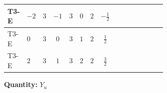 \documentclass[8pt]{article}
\begin{document}
\begin{landscape}
\begin{longtable}{@{}llcccccc >{\raggedright\arraybackslash}p{0.21\linewidth} >{\raggedright\arraybackslash}p{0.21\linewidth} >{\raggedright\arraybackslash}p{0.21\linewidth}@{}}
\midrule
T3-E & $-2$ & $3$ & $-1$ & $3$ & $0$ & $2$ & $-\frac{1}{2}$ & \scriptsize\adjustbox{max width=\linewidth}{$\begin{gathered} 3 \operatorname{Tr}\!\left({Y_d}\,\left({Y_d}\right)^{\dagger}\right) \left({Y_u}\right)_{ij}\end{gathered}$} & \scriptsize\adjustbox{max width=\linewidth}{$\begin{gathered} +\operatorname{Tr}\!\left({Y_e}\,\left({Y_e}\right)^{\dagger}\right) \left({Y_u}\right)_{ij}\end{gathered}$} & \scriptsize\adjustbox{max width=\linewidth}{$\begin{gathered} +3 \operatorname{Tr}\!\left({Y_u}\,\left({Y_u}\right)^{\dagger}\right) \left({Y_u}\right)_{ij}\end{gathered}$} \\
\midrule
T3-E & $0$ & $3$ & $0$ & $3$ & $1$ & $2$ & $\frac{1}{2}$ & \scriptsize\adjustbox{max width=\linewidth}{$\begin{gathered} 3 \operatorname{Tr}\!\left({Y_d}\,\left({Y_d}\right)^{\dagger}\right) \left({Y_u}\right)_{ij}\end{gathered}$} & \scriptsize\adjustbox{max width=\linewidth}{$\begin{gathered} +\operatorname{Tr}\!\left({Y_e}\,\left({Y_e}\right)^{\dagger}\right) \left({Y_u}\right)_{ij}\end{gathered}$} & \scriptsize\adjustbox{max width=\linewidth}{$\begin{gathered} +3 \operatorname{Tr}\!\left({Y_u}\,\left({Y_u}\right)^{\dagger}\right) \left({Y_u}\right)_{ij}\end{gathered}$} \\
\midrule
T3-E & $2$ & $3$ & $1$ & $3$ & $2$ & $2$ & $\frac{3}{2}$ & \scriptsize\adjustbox{max width=\linewidth}{$\begin{gathered} 3 \operatorname{Tr}\!\left({Y_d}\,\left({Y_d}\right)^{\dagger}\right) \left({Y_u}\right)_{ij}\end{gathered}$} & \scriptsize\adjustbox{max width=\linewidth}{$\begin{gathered} +\operatorname{Tr}\!\left({Y_e}\,\left({Y_e}\right)^{\dagger}\right) \left({Y_u}\right)_{ij}\end{gathered}$} & \scriptsize\adjustbox{max width=\linewidth}{$\begin{gathered} +3 \operatorname{Tr}\!\left({Y_u}\,\left({Y_u}\right)^{\dagger}\right) \left({Y_u}\right)_{ij}\end{gathered}$} \\
\midrule
\bottomrule
\end{longtable}
\clearpage
\noindent\textbf{Quantity: }$Y_u$\par\smallskip

\end{landscape}
\end{document}
